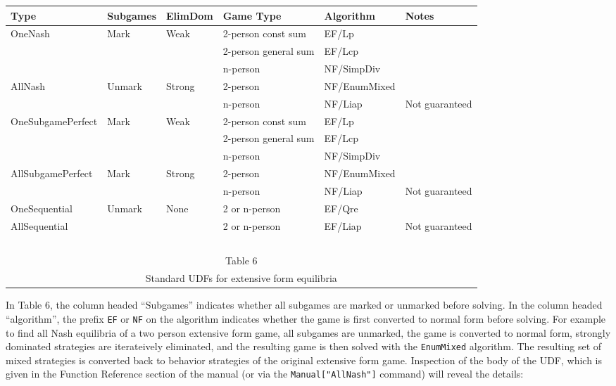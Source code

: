 \medskip
\begin{center}
\begin{tabular}{|l|l|l|p{2cm}|l|l|}
\hline
Type & Subgames & ElimDom & Game Type & Algorithm & Notes\\
\hline
OneNash & Mark & Weak &  2-person const sum & EF/Lp &\\ \cline{4-6}
        &      &      &  2-person general sum & EF/Lcp &\\ \cline{4-6}
        &      &      &  n-person             & NF/SimpDiv &\\
\hline
AllNash &  Unmark & Strong &  2-person       & NF/EnumMixed &\\ \cline{4-6}
        &         &        &  n-person       & NF/Liap &Not guaranteed\\
\hline
\hline
OneSubgamePerfect &  Mark & Weak &  2-person const sum& EF/Lp &\\ \cline{4-6}
                  &       &      &  2-person general sum & EF/Lcp &\\ \cline{4-6}
                  &       &      &  n-person        & NF/SimpDiv &\\
\hline
AllSubgamePerfect &  Mark & Strong &  2-person    & NF/EnumMixed &\\ \cline{4-6}
                  &       &        &  n-person    & NF/Liap &Not guaranteed\\
\hline
\hline
OneSequential &  Unmark & None &  2 or n-person   & EF/Qre &\\ \cline{4-6}
\hline
AllSequential &         &       &  2 or n-person   & EF/Liap &Not guaranteed\\
\hline
\multicolumn{6}{c}{\ }\\
\multicolumn{6}{c}{Table 6}\\
\multicolumn{6}{c}{Standard UDFs for extensive form equilibria}\\
\end{tabular}
\end{center}
\medskip

In Table 6, the column headed ``Subgames'' indicates whether all
subgames are marked or unmarked before solving.  In the column headed
``algorithm'', the prefix \verb+EF+ or \verb+NF+ on the algorithm
indicates whether the game is first converted to normal form before
solving.  For example to find all Nash equilibria of a two person
extensive form game, all subgames are unmarked, the game is converted
to normal form, strongly dominated strategies are iterateively
eliminated, and the resulting game is then solved with the
\verb+EnumMixed+ algorithm.  The resulting set of mixed strategies is
converted back to behavior strategies of the original extensive form
game.  Inspection of the body of the UDF, which is given in the
Function Reference section of the manual (or via the
\verb+Manual["AllNash"]+ command) will reveal the details:

